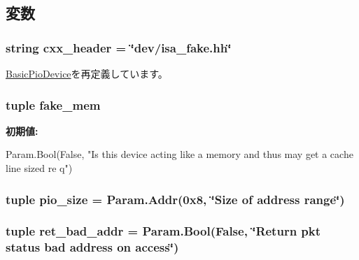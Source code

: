 \subsection{変数}
\hypertarget{classDevice_1_1IsaFake_a17da7064bc5c518791f0c891eff05fda}{
\subsubsection[{cxx\_\-header}]{\setlength{\rightskip}{0pt plus 5cm}string {\bf cxx\_\-header} = \char`\"{}dev/isa\_\-fake.hh\char`\"{}}}
\label{classDevice_1_1IsaFake_a17da7064bc5c518791f0c891eff05fda}


\hyperlink{classDevice_1_1BasicPioDevice_a17da7064bc5c518791f0c891eff05fda}{BasicPioDevice}を再定義しています。\hypertarget{classDevice_1_1IsaFake_a1ee0c21db9d5a6f925abf0785935e82a}{
\subsubsection[{fake\_\-mem}]{\setlength{\rightskip}{0pt plus 5cm}tuple {\bf fake\_\-mem}}}
\label{classDevice_1_1IsaFake_a1ee0c21db9d5a6f925abf0785935e82a}
{\bfseries 初期値:}
\begin{DoxyCode}
Param.Bool(False,
      "Is this device acting like a memory and thus may get a cache line sized re
      q")
\end{DoxyCode}
\hypertarget{classDevice_1_1IsaFake_a33dedf79477cc33b1e0a82044d4d998c}{
\subsubsection[{pio\_\-size}]{\setlength{\rightskip}{0pt plus 5cm}tuple {\bf pio\_\-size} = {\bf Param.Addr}(0x8, \char`\"{}Size of address range\char`\"{})}}
\label{classDevice_1_1IsaFake_a33dedf79477cc33b1e0a82044d4d998c}
\hypertarget{classDevice_1_1IsaFake_afe050af66b0ed365423418f0163f2e10}{
\subsubsection[{ret\_\-bad\_\-addr}]{\setlength{\rightskip}{0pt plus 5cm}tuple {\bf ret\_\-bad\_\-addr} = Param.Bool(False, \char`\"{}Return pkt status bad address on access\char`\"{})}}
\label{classDevice_1_1IsaFake_afe050af66b0ed365423418f0163f2e10}


